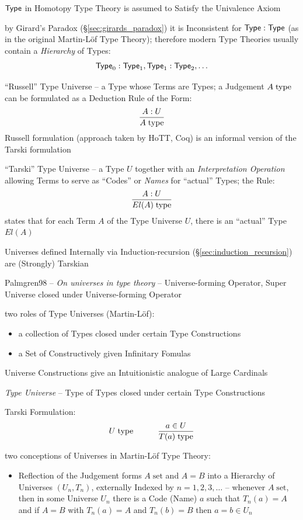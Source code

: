 $\mathsf{Type}$ in Homotopy Type Theory is assumed to Satisfy the Univalence
Axiom

by Girard's Paradox (\S\ref{sec:girards_paradox}) it is Inconsistent
for $\mathsf{Type} : \mathsf{Type}$ (as in the original Martin-L\"of Type Theory);
therefore modern Type Theories usually contain a \emph{Hierarchy} of
Types:
\[
  \mathsf{Type}_0 : \mathsf{Type}_1, \mathsf{Type}_1 : \mathsf{Type}_2, \ldots
\]

``Russell'' Type Universe -- a Type whose Terms are Types; a Judgement
$A \;\mathrm{type}$ can be formulated as a Deduction Rule of the Form:
\[
  \frac{A:U}{A \;\mathrm{type}}
\]
Russell formulation (approach taken by HoTT, Coq) is an informal
version of the Tarski formulation

``Tarski'' Type Universe -- a Type $U$ together with an
\emph{Interpretation Operation} allowing Terms to serve as ``Codes''
or \emph{Names} for ``actual'' Types; the Rule:
\[
  \frac{A:U}{El(A) \;\mathrm{type}}
\]
states that for each Term $A$ of the Type Universe $U$, there is an
``actual'' Type $El(A)$

Universes defined Internally via Induction-recursion
(\S\ref{sec:induction_recursion}) are (Strongly) Tarskian


\asterism

\begingroup %

\newcommand{\sett}{\;\mathrm{set}}


Palmgren98 -- \emph{On universes in type theory} -- Universe-forming
Operator, Super Universe closed under Universe-forming Operator

two roles of Type Universes (Martin-L\"of):
\begin{itemize}
  \item a collection of Types closed under certain Type Constructions
  \item a Set of Constructively given Infinitary Fomulas
\end{itemize}

Universe Constructions give an Intuitionistic analogue of Large
Cardinals

\emph{Type Universe} -- Type of Types closed under certain Type
Constructions

Tarski Formulation:
\[
  U \;\mathrm{type} \quad\quad\quad \frac{a \in U}{T(a) \;\mathrm{type}}
\]

two conceptions of Universes in Martin-L\"of Type Theory:
\begin{itemize}
  \item Reflection of the Judgement forms $A \sett$ and $A = B$ into a
    Hierarchy of Universes $(U_n,T_n)$, externally Indexed by $n =
    1,2,3,\ldots$ -- whenever $A \sett$, then in some Universe $U_n$
    there is a Code (Name) $a$ such that $T_n(a) = A$ and if $A = B$
    with $T_n(a) = A$ and $T_n(b) = B$ then $a = b \in U_n$
\end{itemize}

